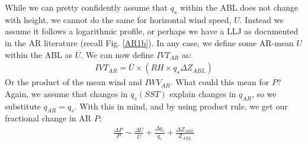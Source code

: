 \documentclass[letterpaper,12pt]{article}
\begin{document}
While we can pretty confidently assume that $q_s$ within the ABL does not change with height, we cannot do the same for horizontal wind speed, $U$. Instead we assume it follows a logarithmic profile, or perhaps we have a LLJ as documented in the AR literature (recall Fig. \ref{AR1b}). In any case, we define some AR-mean $U$ within the ABL as $\overline{U}$. We can now define $IVT_{AR}$ as: 
\begin{align}\label{eq:ArIVT}
    IVT_{AR} = \overline{U}\times(RH\times q_s \Delta Z_{ABL})
\end{align}
Or the product of the mean wind and $IWV_{AR}$. 
What could this mean for $P$? Again, we assume that changes in $q_s(SST)$ explain changes in $q_{AR}$, so we substitute $q_{AR} = q_s$. With this in mind, and by using product rule, we get our fractional change in AR $P$: 
\begin{align}\label{eq:IVTandP}
    \frac{\Delta P}P \sim \frac{\Delta \overline{U}}{\overline{U}} + \frac{\Delta q_s}{q_s} + \frac{\Delta Z_{ABL}}{Z_{ABL}}
\end{align}
\end{document}
